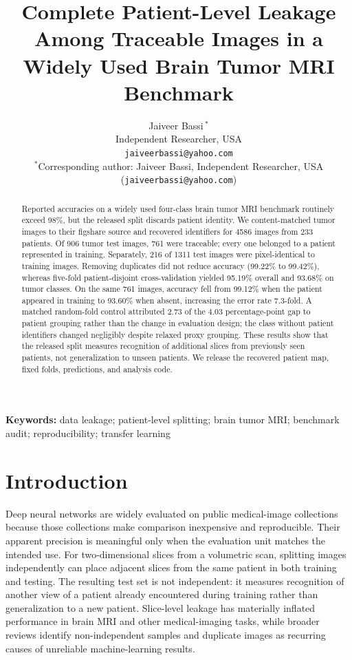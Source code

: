 ﻿\documentclass[11pt]{article}
\title{\textbf{Complete Patient-Level Leakage Among Traceable Images in a Widely Used Brain Tumor MRI Benchmark}}
\author{Jaiveer Bassi\,\orcidlink{0009-0006-3633-3220}$^{*}$\\
Independent Researcher, USA\\
\texttt{jaiveerbassi@yahoo.com}\\[2pt]
{\small $^{*}$Corresponding author: Jaiveer Bassi, Independent Researcher, USA (\texttt{jaiveerbassi@yahoo.com})}}
\date{}
\begin{document}
\maketitle
\linenumbers
\begin{abstract}
Reported accuracies on a widely used four-class brain tumor MRI benchmark routinely exceed 98\%, but the released split discards patient identity. We content-matched tumor images to their figshare source and recovered identifiers for 4586 images from 233 patients. Of 906 tumor test images, 761 were traceable; every one belonged to a patient represented in training. Separately, 216 of 1311 test images were pixel-identical to training images. Removing duplicates did not reduce accuracy (99.22\% to 99.42\%), whereas five-fold patient-disjoint cross-validation yielded 95.19\% overall and 93.68\% on tumor classes. On the same 761 images, accuracy fell from 99.12\% when the patient appeared in training to 93.60\% when absent, increasing the error rate 7.3-fold. A matched random-fold control attributed 2.73 of the 4.03 percentage-point gap to patient grouping rather than the change in evaluation design; the class without patient identifiers changed negligibly despite relaxed proxy grouping. These results show that the released split measures recognition of additional slices from previously seen patients, not generalization to unseen patients. We release the recovered patient map, fixed folds, predictions, and analysis code.
\end{abstract}

\vspace{0.5em}
\noindent\textbf{Keywords:} data leakage; patient-level splitting; brain tumor MRI; benchmark audit; reproducibility; transfer learning

\section{Introduction}
Deep neural networks are widely evaluated on public medical-image collections because those collections make comparison inexpensive and reproducible. Their apparent precision is meaningful only when the evaluation unit matches the intended use. For two-dimensional slices from a volumetric scan, splitting images independently can place adjacent slices from the same patient in both training and testing. The resulting test set is not independent: it measures recognition of another view of a patient already encountered during training rather than generalization to a new patient. Slice-level leakage has materially inflated performance in brain MRI and other medical-imaging tasks\cite{yagis2021effect,wen2020convolutional}, while broader reviews identify non-independent samples and duplicate images as recurring causes of unreliable machine-learning results\cite{kapoor2023leakage,roberts2021common}.
\end{document}
